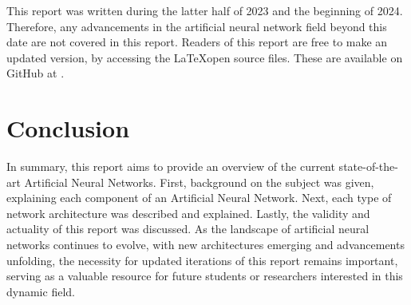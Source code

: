 \documentclass[conference]{IEEEtran}
\begin{document}
This report was written during the latter half of 2023 and the beginning of 2024. Therefore, any advancements in the artificial neural network field beyond this date are not covered in this report. Readers of this report are free to make an updated version, by accessing the \LaTeX \space open source files. These are available on GitHub at \cite{giovannilin-no-date}. %

\section{Conclusion} \label{Conclusion} %
In summary, this report aims to provide an overview of the current state-of-the-art Artificial Neural Networks. First, background on the subject was given, explaining each component of an Artificial Neural Network. Next, each type of network architecture was described and explained. Lastly, the validity and actuality of this report was discussed. As the landscape of artificial neural networks continues to evolve, with new architectures emerging and advancements unfolding, the necessity for updated iterations of this report remains important, serving as a valuable resource for future students or researchers interested in this dynamic field.







\end{document}
